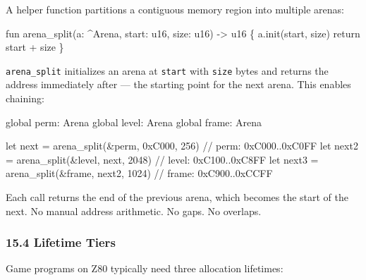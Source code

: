 \documentclass[
  11pt,
]{article}
\newenvironment{Shaded}{\begin{snugshade}}{\end{snugshade}}
\newcommand{\NormalTok}[1]{#1}
\begin{document}
A helper function partitions a contiguous memory region into multiple
arenas:

\begin{Shaded}
\begin{Highlighting}[]
\NormalTok{fun arena\_split(a: \^{}Arena, start: u16, size: u16) {-}\textgreater{} u16 \{}
\NormalTok{    a.init(start, size)}
\NormalTok{    return start + size}
\NormalTok{\}}
\end{Highlighting}
\end{Shaded}

\texttt{arena\_split} initializes an arena at \texttt{start} with
\texttt{size} bytes and returns the address immediately after --- the
starting point for the next arena. This enables chaining:

\begin{Shaded}
\begin{Highlighting}[]
\NormalTok{global perm: Arena}
\NormalTok{global level: Arena}
\NormalTok{global frame: Arena}

\NormalTok{let next = arena\_split(\&perm, 0xC000, 256)     // perm: 0xC000..0xC0FF}
\NormalTok{let next2 = arena\_split(\&level, next, 2048)     // level: 0xC100..0xC8FF}
\NormalTok{let next3 = arena\_split(\&frame, next2, 1024)    // frame: 0xC900..0xCCFF}
\end{Highlighting}
\end{Shaded}

Each call returns the end of the previous arena, which becomes the start
of the next. No manual address arithmetic. No gaps. No overlaps.

\hypertarget{lifetime-tiers}{%
\subsubsection{15.4 Lifetime Tiers}\label{lifetime-tiers}}

Game programs on Z80 typically need three allocation lifetimes:
\end{document}
